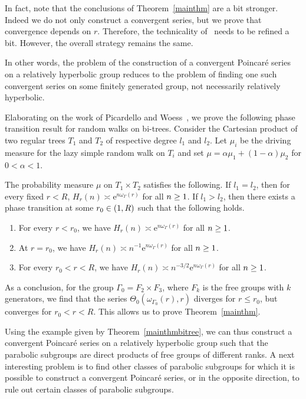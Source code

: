\documentclass[AHL,Unicode,longabstracts]{cedram}
\newcommand{\rme}{\mathrm{e}}
\let\oldin\in
\renewcommand{\in}{\mathchoice{\oldin}{\oldin}{\,\oldin\,}{\,\oldin\,}}
\let\oldge\ge
\renewcommand{\ge}{\mathchoice{\oldge}{\oldge}{\,\oldge\,}{\,\oldge\,}}
\begin{document}
In fact, note that the conclusions of Theorem~\ref{mainthm} are a bit stronger. Indeed we do not only construct a convergent series, but we prove that convergence depends on $r$. Therefore, the technicality of~\cite[Example~C]{DWY} needs to be refined a bit. However, the overall strategy remains the same.

In other words, the problem of the construction of a convergent Poincaré series on a relatively hyperbolic group reduces to the problem of finding one such convergent series on some finitely generated group, not necessarily relatively hyperbolic.


Elaborating on the work of Picardello and Woess~\cite{PicardelloWoessbitree}, we prove the following phase transition result for random walks on bi-trees. Consider the Cartesian product of two regular trees $T_1$ and $T_2$ of respective degree $l_1$ and $l_2$. Let $\mu_i$ be {the driving measure for the lazy simple random walk} on $T_i$ and set $\mu=\alpha \mu_1 +(1-\alpha)\mu_2$ for $0<\alpha<1$.

\begin{theo}\label{mainthmbitree}
The probability measure $\mu$ on $T_1\times T_2$ satisfies the following. If $l_1=l_2$, then for every fixed $r<R$, $H_r(n)\asymp \rme^{n\omega_\Gamma(r)}$ for all $n\ge 1$. If $l_1>l_2$, then there exists a phase transition at some $r_0\in (1,R)$ such that the following holds.
\begin{enumerate}
\item\label{theo1.6.1} For every $r<r_0$, we have $H_r(n)\asymp \rme^{n\omega_\Gamma(r)}$ for all $n\ge 1$.
\item\label{theo1.6.2} At $r=r_0$, we have $H_r(n)\asymp n^{-1}\rme^{n\omega_\Gamma(r)}$ for all $n\ge 1$.
\item\label{theo1.6.3} For every $r_0<r<R$, we have $H_r(n)\asymp n^{-3/2}\rme^{n\omega_\Gamma(r)}$ for all $n\ge 1$.
\end{enumerate}
\end{theo}

As a conclusion, for the group $\Gamma_0=F_2\times F_3$, where $F_k$ is the free groups with $k$ generators, we find that the series $\Theta_0(\omega_{{\Gamma_0}}(r),r)$ diverges for $r\leq r_0$, but converges for $r_0<r<R$. This allows us to prove Theorem~\ref{mainthm}.

Using the example given by Theorem~\ref{mainthmbitree}, we can thus construct a convergent Poincaré series on a relatively hyperbolic group such that the parabolic subgroups are {direct products of free groups of different ranks}. A next interesting problem is to find other classes of parabolic subgroups for which it is possible to construct a convergent Poincaré series, or in the opposite direction, to rule out certain classes of parabolic subgroups.
\end{document}
